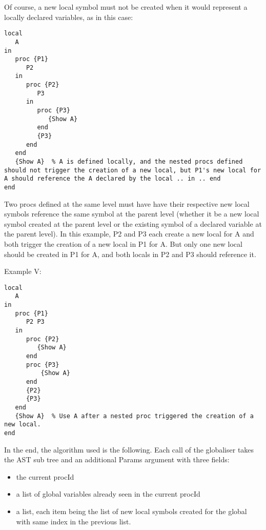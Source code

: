 \documentclass[a4paper]{memoir}
\begin{document}
Of course, a new local symbol must not be created when it would represent a locally declared variables, as in this case:

\begin{lstlisting}
local
   A
in
   proc {P1}
      P2
   in
      proc {P2}
         P3
      in
         proc {P3}
            {Show A}
         end
         {P3}
      end
   end
   {Show A}  % A is defined locally, and the nested procs defined should not trigger the creation of a new local, but P1's new local for A should reference the A declared by the local .. in .. end
end
\end{lstlisting}

Two procs defined at the same level must have have their respective new local symbols reference the same symbol at the parent level (whether it be a new local symbol created at the parent level or the existing symbol of a declared variable at the parent level). In this example, P2 and P3 each create a new local for A and both trigger the creation of a new local in P1 for A. But only one new local should be created in P1 for A, and both locals in P2 and P3 should reference it.


Example V:
\begin{lstlisting}
local
   A
in
   proc {P1}
      P2 P3
   in
      proc {P2}
         {Show A}
      end
      proc {P3}
          {Show A}
      end
      {P2}
      {P3}
   end
   {Show A}  % Use A after a nested proc triggered the creation of a new local.
end
\end{lstlisting}

In the end, the algorithm used is the following.
Each call of the globaliser takes the AST sub tree and an additional Params argument with three fields:
\begin{itemize}
   \item the current procId
   \item a list of global variables already seen in the current procId
   \item a list, each item being the list of new local symbols created for the global with same index in the previous list.
\end{itemize}
\end{document}
